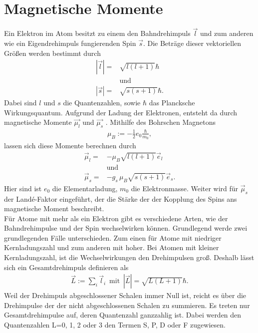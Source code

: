 

\section{Magnetische Momente}
Ein Elektron im Atom besitzt zu einem den Bahndrehimpuls $\vec{l}$ und zum anderen wie ein Eigendrehimpuls fungierenden Spin $\vec{s}$.
Die Beträge dieser vektoriellen Größen werden bestimmt durch
\begin{align}
	|\vec{l}|=&\sqrt{l(l+1)}\hbar\\
	\nonumber &\text{und}\\
	|\vec{s}|=&\sqrt{s(s+1)}\hbar.
\end{align}
Dabei sind $l$ und $s$ die Quantenzahlen, sowie $\hbar$ das Plancksche Wirkungsquantum.
Aufgrund der Ladung der Elektronen, entsteht da durch magnetische Momente $\vec{\mu_l}$ und $\vec{\mu_s}$ .
Mithilfe des Bohrschen Magnetons 
\begin{align}
	\mu_B:=-\frac{1}{2}e_0 \frac{\hbar}{m_0},
\end{align}
lassen sich diese Momente berechnen durch
\begin{align}
	\vec{\mu}_l=&-\mu_B\sqrt{l(l+1)}\vec{e}_l\\
	\nonumber &\text{und}\\
	\vec{\mu}_s=&-g_s\,\mu_B\sqrt{s(s+1)}\vec{e}_s.
\end{align}
Hier sind ist $e_0$ die Elementarladung, $m_0$ die Elektronmasse.
Weiter wird für $\vec{\mu}_s$ der Landé-Faktor eingeführt, der die Stärke der der Kopplung des Spins ans magnetische Moment beschreibt.\\
Für Atome mit mehr als ein Elektron gibt es verschiedene Arten, wie der Bahndrehimpulse und der Spin wechselwirken können.
Grundlegend werde zwei grundlegenden Fälle unterschieden.
Zum einen für Atome mit niedriger Kernladungszahl und zum anderen mit hoher.
Bei Atomen mit kleiner Kernladungszahl, ist die Wechselwirkungen den Drehimpulsen groß.
Deshalb lässt sich ein Gesamtdrehimpuls definieren als
\begin{align}
	\vec{L}:=\sum_i \vec{l}_i\, \text{ mit }\, |\vec{L}|=\sqrt{L(L+1)}\hbar.
\end{align}
Weil der Drehimpuls abgeschlossener Schalen immer Null ist, reicht es über die Drehimpulse der der nicht abgeschlossenen Schalen zu summieren.
Es treten nur Gesamtdrehimpulse auf, deren Quantenzahl ganzzahlig ist.
Dabei werden den Quantenzahlen L=0, 1, 2 oder 3 den Termen S, P, D oder F zugewiesen.\\
